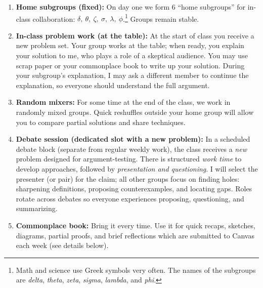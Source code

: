 \documentclass[oneside,11pt]{amsart}
\begin{document}
\begin{enumerate}[$\bullet$]
  \item \textbf{Home subgroups (fixed):} On day one we form 6 ``home subgroups'' for in-class collaboration:
  $\delta, \ \theta, \ \zeta, \ \sigma, \ \lambda, \ \phi$.\footnote{Math and science use Greek symbols very often. The names of the subgroups are 
	\emph{delta}, \emph{theta}, \emph{zeta}, \emph{sigma}, \emph{lambda}, and \emph{phi}.}
	Groups remain stable.


	\item \textbf{In-class problem work (at the table):} At
	the start of class you receive a new problem set.
	Your group works at the table; when ready, you explain
	your solution to me, who plays a role of a skeptical audience.
	You may use scrap paper or your commonplace book to write up your solution.
	During your subgroup's explanation, I may ask a different member to continue the explanation,
	so everyone should understand the full argument.

  \item \textbf{Random mixers:} 
		For some time at the end of the class, we work 
		in randomly mixed groups.
		Quick reshuffles outside your home group will allow you
		to compare partial solutions and share techniques.
		
	 \item \textbf{Debate session (dedicated slot with a new
	 problem):} In a scheduled debate block (separate from
	 regular weekly work), the class receives a \emph{new}
	 problem designed for argument-testing. There is
	 structured \emph{work time} to develop approaches,
	 followed by \emph{presentation and questioning}. I will
	 select the presenter (or pair) for the claim; all other
	 groups focus on finding holes: sharpening definitions,
	 proposing counterexamples, and locating gaps. Roles
	 rotate across debates so everyone experiences proposing,
	 questioning, and summarizing.

  \item \textbf{Commonplace book:} Bring it every time.
	Use it for quick recaps, sketches, diagrams, partial
	proofs, and brief reflections which are submitted
	to Canvas each week (see details below).


\end{enumerate}
\end{document}

